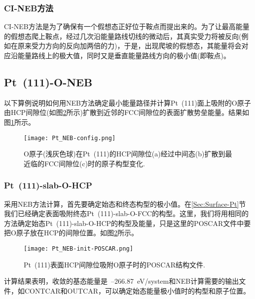 \subsubsection{\rm{CI-NEB}方法}
\textrm{CI-NEB}方法是为了确保有一个假想态正好位于鞍点而提出来的。为了让最高能量的假想态爬上鞍点，经过几次沿能量路线切线的微动后，其真实受力将被反向(例如在原来受力方向的反向加两倍的力)，于是，出现爬坡的假想态，其能量将会对应沿能量路线上的极大值，同时又是垂直能量路线方向的极小值(即鞍点)。
\subsection{Pt~(111)-O-NEB}
以下算例说明如何用\textrm{NEB}方法确定最小能量路径并计算\textrm{Pt~(111)}面上吸附的\textrm{O}原子由\textrm{HCP}间隙位(如图\ref{Pt_NEB-init-POSCAR}所示)扩散到近邻的\textrm{FCC}间隙位的表面扩散势垒能量。结果如图\ref{Pt_NEB-config}所示。
\begin{figure}[h!]
\centering
\texttt{[image: Pt\_NEB-config.png]}
\caption{\small \textrm{\textrm{O}原子(浅灰色球)在\textrm{Pt~(111)}的\textrm{HCP}间隙位(a)经过中间态(b)扩散到最近临的\textrm{FCC}间隙位(c)时的原子构型变化}.}%
\label{Pt_NEB-config}
\end{figure} 

\subsubsection{\rm{Pt~(111)-slab-O-HCP}}
采用\textrm{NEB}方法计算，首先要确定始态和终态构型的极小值。在\ref{Sec:Surface-Pt}节我们已经确定表面吸附终态\textrm{Pt~(111)-slab-O-FCC}的构型。这里，我们将用相同的方法确定始态\textrm{Pt~(111)-slab-O-HCP}的构型及能量，只是这里的\textrm{POSCAR}文件中要把\textrm{O}原子放在\textrm{HCP}的间隙位置。如图\ref{Pt_NEB-init-POSCAR}所示。
\begin{figure}[h!]
\centering
\texttt{[image: Pt\_NEB-init-POSCAR.png]}
\caption{\small \textrm{\textrm{Pt~(111)}表面\textrm{HCP}间隙位吸附\textrm{O}原子时的\textrm{POSCAR}结构文件}.}%
\label{Pt_NEB-init-POSCAR}
\end{figure}

计算结果表明，收敛的基态能量是~--266.87\textrm{~eV/system}和\textrm{NEB}计算需要的输出文件，如\textrm{CONTCAR}和\textrm{OUTCAR}，可以确定始态能量极小值时的构型和原子位置。
